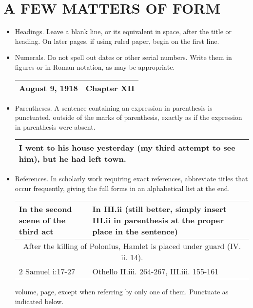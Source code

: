 \documentclass[10pt]{report}
\begin{document}
\chapter {A FEW MATTERS OF FORM}

\begin{itemize}
  \item Headings. Leave a blank line, or its equivalent in space, after the title or heading. On later pages, if using ruled paper, begin on the first
line.
  \item Numerals. Do not spell out dates or other serial numbers. Write them in figures
or in Roman notation, as may be appropriate.
	\begin{table}[!tbh]
    \centering
        \begin{tabular}{|m{10em}|m{10em}|}
        \hline
        August 9, 1918 & Chapter XII\\
        \hline

 \end{tabular}
 \end{table}
 
 \item 
Parentheses. A sentence containing an expression in parenthesis is punctuated,
outside of the marks of parenthesis, exactly as if the expression in parenthesis
were absent. 
\begin{table}[!tbh]
    \centering
        \begin{tabular}{|m{18em}|}
        \hline
        I went to his house yesterday (my third attempt to see
him), but he had left town.\\
\hline

 \end{tabular}
 \end{table}




\item
References. In scholarly work requiring exact references, abbreviate titles that
occur frequently, giving the full forms in an alphabetical list at the end.

 \begin{table}[!tbh]
    \centering
        \begin{tabular}{|m{18em}|m{18em}|}
        \hline
        In the second scene of the
third act &
In III.ii (still better, simply insert
III.ii in parenthesis at the
proper place in the sentence)\\
\hline
\multicolumn{2}{|c|}{After the killing of Polonius, Hamlet is placed under guard
(IV. ii. 14).}\\
\hline
2 Samuel i:17-27 & Othello II.iii. 264-267,
III.iii. 155-161 \\
\hline
 \end{tabular}
 \end{table}volume, page, except
when referring by only one of them. Punctuate as indicated below.


\end{itemize}
\end{document}
